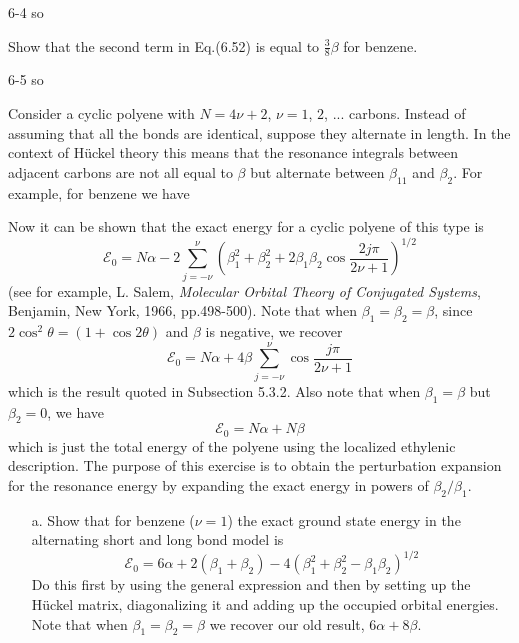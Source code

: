 \documentclass[a4paper]{book}
\begin{document}
	\begin{solution}
		6-4 so
	\end{solution}
	
	\begin{exercise}
	Show that the second term in Eq.(6.52) is equal to $\frac{3}{8}\beta$ for benzene.
	\end{exercise}
	
	\begin{solution}
		6-5 so
	\end{solution}
	
	\begin{exercise}
	Consider a cyclic polyene with $N = 4\nu+2$, $\nu=1$, $2$, ... carbons. Instead of assuming that all the bonds are identical, suppose they alternate in length. In the context of H{\"u}ckel theory this means that the resonance integrals between adjacent carbons are not all equal to $\beta$ but alternate between $\beta_11$ and $\beta_2$. For example, for benzene we have
	
	
	Now it can be shown that the exact energy for a cyclic polyene of this type is
	\[
		\mathscr{E}_0 = N \alpha - 2 \sum_{j=-\nu}^\nu \left( \beta^2_1 + \beta^2_2 + 2 \beta_1 \beta_2 \cos{\frac{2j\pi}{2\nu+1}} \right)^{1/2}
	\]
	(see for example, L. Salem, {\it Molecular Orbital Theory of Conjugated Systems}, Benjamin, New York, 1966, pp.498-500). Note that when $\beta_1 = \beta_2 = \beta$, since $2\cos^2\theta=(1+\cos2\theta)$ and $\beta$ is negative, we recover
	\[
		\mathscr{E}_0 = N \alpha + 4 \beta \sum_{j=-\nu}^\nu \cos{\frac{j\pi}{2\nu+1}}
	\]
	which is the result quoted in Subsection 5.3.2. Also note that when $\beta_1=\beta$ but $\beta_2=0$, we have
	\[
		\mathscr{E}_0 = N \alpha + N \beta
	\]
	which is just the total energy of the polyene using the localized ethylenic description. The purpose of this exercise is to obtain the perturbation expansion for the resonance energy by expanding the exact energy in powers of $\beta_2/\beta_1$.
	\begin{enumerate}
	
	\item[a.] Show that for benzene ($\nu=1$) the exact ground state energy in the alternating short and long bond model is
	\[
		\mathscr{E}_0 = 6 \alpha + 2(\beta_1 + \beta_2) - 4 ( \beta^2_1 + \beta^2_2 - \beta_1 \beta_2 )^{1/2}
	\]
	Do this first by using the general expression and then by setting up the H{\"u}ckel matrix, diagonalizing it and adding up the occupied orbital energies. Note that when $\beta_1=\beta_2=\beta$ we recover our old result, $6\alpha+8\beta$.
	

\end{enumerate}
\end{exercise}
\end{document}

